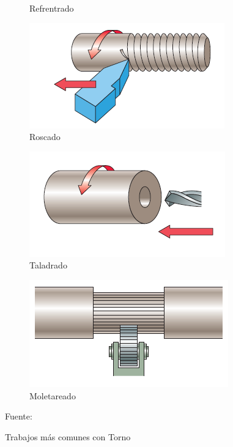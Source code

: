 \begin{figure}[hbt]
\begin{subfigure}{0.3\textwidth}
        \caption{Refrentrado}
        \label{fig:Refretado}
    \end{subfigure}
    \begin{subfigure}{0.3\textwidth}
        \centering
        \includegraphics[width=0.9\linewidth]{Cap1_FormulaciondelProyecto/roscado.PNG}
        \caption{Roscado}
        \label{fig:Roscado}
    \end{subfigure}
     \begin{subfigure}{0.3\textwidth}
        \centering
        \includegraphics[width=0.9\linewidth]{Cap1_FormulaciondelProyecto/Taladrado.PNG}
        \caption{Taladrado}
        \label{fig:Taladrado}
    \end{subfigure}
     \begin{subfigure}{0.3\textwidth}
        \centering
        \includegraphics[width=0.9\linewidth]{Cap1_FormulaciondelProyecto/mo.PNG}
        \caption{Moletareado}
        \label{fig:mo}
    \end{subfigure}

    \caption{Trabajos más comunes con Torno}{Fuente: \citep{Fenoll2009}}
    \label{fig:TabajosTorno}
\end{figure}
 

